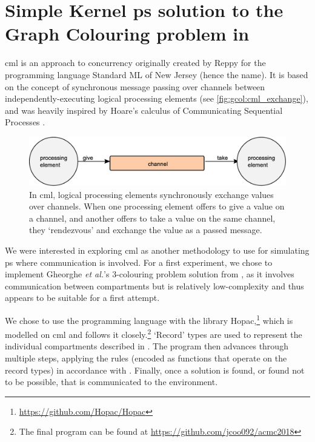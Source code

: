 \section{\label{sec:gcol:cml}Simple Kernel \texorpdfstring{\gls{ps}}{P systems} solution to the Graph Colouring problem in \texorpdfstring{}{Concurrent ML}}
\Gls{cml} is an approach to concurrency originally created by Reppy \cite{Reppy1991} for the programming language Standard ML of New Jersey (hence the name).  It is based on the concept of synchronous message passing over channels between independently-executing logical processing elements \cite{Panangaden1997} (see \autoref{fig:gcol:cml_exchange}), and was heavily inspired by Hoare's calculus of Communicating Sequential Processes \cite{Hoare1985}.  

\begin{figure}
    \centering
    \includegraphics[width=\textwidth]{chapters/gcol/figs/cml_exchange.eps}
    \caption{In \gls{cml}, logical processing elements synchronously exchange values over channels.  When one processing element offers to give a value on a channel, and another offers to take a value on the same channel, they ‘rendezvous’ and exchange the value as a passed message.}
    \label{fig:gcol:cml_exchange}
\end{figure}

We were interested in exploring \gls{cml} as another methodology to use for simulating \gls{ps} where communication is involved.  For a first experiment, we chose to implement Gheorghe \textit{et al.}'s 3-colouring problem solution from \cite{Gheorghe2013}, as it involves communication between compartments but is relatively low-complexity and thus appears to be suitable for a first attempt.

We chose to use the programming language \fsharp{} with the library Hopac,\footnote{\url{https://github.com/Hopac/Hopac}} which is modelled on \gls{cml} and follows it closely.\footnote{The final program can be found at \url{https://github.com/jcoo092/acmc2018}}  `Record' types are used to represent the individual compartments described in \cite{Gheorghe2013}.  The program then advances through multiple steps, applying the rules (encoded as functions that operate on the record types) in accordance with \cite{Gheorghe2013}.  Finally, once a solution is found, or found not to be possible, that is communicated to the environment.

